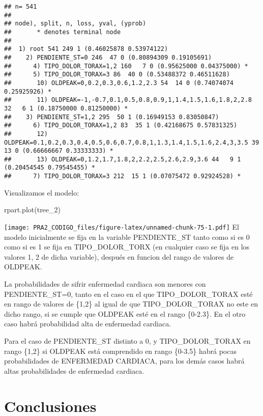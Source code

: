 \documentclass[
]{article}
\newenvironment{Shaded}{\begin{snugshade}}{\end{snugshade}}
\newcommand{\FunctionTok}[1]{\textcolor[rgb]{0.94,0.94,0.56}{#1}}
\newcommand{\NormalTok}[1]{\textcolor[rgb]{0.80,0.80,0.80}{#1}}
\begin{document}
\begin{verbatim}
## n= 541 
## 
## node), split, n, loss, yval, (yprob)
##       * denotes terminal node
## 
##  1) root 541 249 1 (0.46025878 0.53974122)  
##    2) PENDIENTE_ST=0 246  47 0 (0.80894309 0.19105691)  
##      4) TIPO_DOLOR_TORAX=1,2 160   7 0 (0.95625000 0.04375000) *
##      5) TIPO_DOLOR_TORAX=3 86  40 0 (0.53488372 0.46511628)  
##       10) OLDPEAK=0,0.2,0.3,0.6,1.2,2.3 54  14 0 (0.74074074 0.25925926) *
##       11) OLDPEAK=-1,-0.7,0.1,0.5,0.8,0.9,1,1.4,1.5,1.6,1.8,2,2.8 32   6 1 (0.18750000 0.81250000) *
##    3) PENDIENTE_ST=1,2 295  50 1 (0.16949153 0.83050847)  
##      6) TIPO_DOLOR_TORAX=1,2 83  35 1 (0.42168675 0.57831325)  
##       12) OLDPEAK=0.1,0.2,0.3,0.4,0.5,0.6,0.7,0.8,1,1.3,1.4,1.5,1.6,2.4,3,3.5 39  13 0 (0.66666667 0.33333333) *
##       13) OLDPEAK=0,1.2,1.7,1.8,2,2.2,2.5,2.6,2.9,3.6 44   9 1 (0.20454545 0.79545455) *
##      7) TIPO_DOLOR_TORAX=3 212  15 1 (0.07075472 0.92924528) *
\end{verbatim}

Visualizamos el modelo:

\begin{Shaded}
\begin{Highlighting}[]
\FunctionTok{rpart.plot}\NormalTok{(tree\_2)}
\end{Highlighting}
\end{Shaded}

\texttt{[image: PRA2\_CODIGO\_files/figure-latex/unnamed-chunk-75-1.pdf]}
El modelo inicialmente se fija en la variable PENDIENTE\_ST tanto como
si es 0 como si es 1 se fija en TIPO\_DOLOR\_TORX (en cualquier caso se
fija en los valores 1, 2 de dicha variable), después en funcion del
rango de valores de OLDPEAK.

La probabilidades de sifrir enfermedad cardiaca son menores con
PENDIENTE\_ST=0, tanto en el caso en el que TIPO\_DOLOR\_TORAX esté en
rango de valores de \{1,2\} al igual de que TIPO\_DOLOR\_TORAX no este
en dicho rango, si se cumple que OLDPEAK esté en el rango \{0-2.3\}. En
el otro caso habrá probabilidad alta de enfermedad cardiaca.

Para el caso de PENDIENTE\_ST distinto a 0, y TIPO\_DOLOR\_TORAX en
rango \{1,2\} si OLDPEAK está comprendido en rango \{0-3.5\} habrá pocas
probabilidades de ENFERMEDAD CARDIACA, para los demás casos habrá altas
probabilidades de enfermedad cardiaca.

\hypertarget{conclusiones}{%
\section{Conclusiones}\label{conclusiones}}
\end{document}
